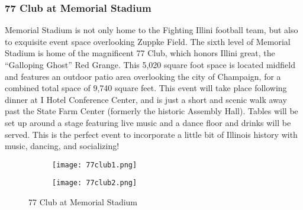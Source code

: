 \subsubsection{77 Club at Memorial Stadium}
Memorial Stadium is not only home to the Fighting Illini football team, but also to exquisite event space overlooking Zuppke Field. The sixth level of Memorial Stadium is home of the magnificent 77 Club, which honors Illini great, the ``Galloping Ghost'' Red Grange. This 5,020 square foot space is located midfield and features an outdoor patio area overlooking the city of Champaign, for a combined total space of 9,740 square feet. This event will take place following dinner at I Hotel Conference Center, and is just a short and scenic walk away past the State Farm Center (formerly the historic Assembly Hall). Tables will be set up around a stage featuring live music and a dance floor and drinks will be served. This is the perfect event to incorporate a little bit of Illinois history with music, dancing, and socializing! 
\vspace{0.5cm}\newline
\begin{figure}[H]

	\centering
	\begin{subfigure}{0.5\textwidth}
		\centering
		\texttt{[image: 77club1.png]}
	\end{subfigure}%
	\begin{subfigure}{0.5\textwidth}
		\centering
		\texttt{[image: 77club2.png]}
	\end{subfigure}
	\caption{77 Club at Memorial Stadium}		
\end{figure} 

%


